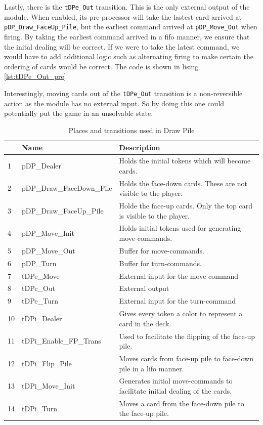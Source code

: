 \documentclass[runningheads,a4paper]{llncs}
\newcommand{\GPenSIM}{../GPenSIM}
\begin{document}
Lastly, there is the \verb!tDPe_Out! transition. This is the only external output of the module. When enabled, its pre-processor will take the lastest card arrived at \verb!pDP_Draw_FaceUp_Pile!, but the earliest command arrived at \verb!pDP_Move_Out! when firing. By taking the earliest command arrived in a \ac{fifo} manner, we ensure that the inital dealing will be correct. If we were to take the latest command, we would have to add additional logic such as alternating firing to make certain the ordering of cards would be correct. The code is shown in lising \ref{lst:tDPe_Out_pre}

Interestingly, moving cards out of the \verb!tDPe_Out! transition is a non-reversible action as the module has no external input. So by doing this one could potentially put the game in an unsolvable state.
\begin{table}
	\caption{Places and transitions used in Draw Pile}
	\begin{tabular}{|l|l|l|}
		\hline
		& Name & Description \\
		\hline
		1  & pDP\_Dealer               & Holds the initial tokens which will become cards. \\ \hline
		2  & pDP\_Draw\_FaceDown\_Pile & Holds the face-down cards. These are not visible to the player. \\ \hline
		3  & pDP\_Draw\_FaceUp\_Pile   & Holde the face-up cards. Only the top card is visible to the player. \\ \hline
		4  & pDP\_Move\_Init           & Holds initial tokens used for generating move-commands. \\ \hline
		5  & pDP\_Move\_Out            & Buffer for move-commands.  \\ \hline
		6  & pDP\_Turn                 & Buffer for turn-commands. \\ \hline
		7  & tDPe\_Move               &   External input for the move-\ac{command} \\ \hline
		8  & tDPe\_Out                &   External output \\ \hline
		9  & tDPe\_Turn               &   External input for the turn-\ac{command} \\ \hline
		10  & tDPi\_Dealer             &   Gives every token a color to represent a card in the deck. \\ \hline
		11  & tDPi\_Enable\_FP\_Trans  &   Used to facilitate the flipping of the face-up pile. \\ \hline
		12  & tDPi\_Flip\_Pile         &   Moves cards from face-up pile to face-down pile in a \ac{lifo} manner. \\ \hline
		13  & tDPi\_Move\_Init         &   Generates initial move-commands to facilitate initial dealing of the cards. \\ \hline
		14  & tDPi\_Turn               &   Moves a card from the face-down pile to the face-up pile. \\ \hline
	\end{tabular}
\end{table}
\clearpage
\end{document}
